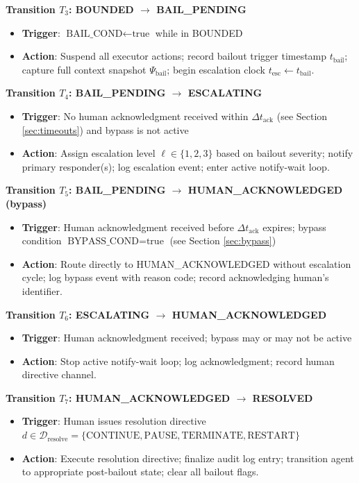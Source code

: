 \medskip\noindent\textbf{Transition $T_3$: BOUNDED $\rightarrow$ BAIL\_PENDING}
\begin{itemize}
  \item \textbf{Trigger}: $\text{BAIL\_COND} \gets \text{true}$ while in BOUNDED
  \item \textbf{Action}: Suspend all executor actions; record bailout trigger timestamp $t_{\text{bail}}$; capture full context snapshot $\Psi_{\text{bail}}$; begin escalation clock $t_{\text{esc}} \gets t_{\text{bail}}$.
\end{itemize}

\medskip\noindent\textbf{Transition $T_4$: BAIL\_PENDING $\rightarrow$ ESCALATING}
\begin{itemize}
  \item \textbf{Trigger}: No human acknowledgment received within $\Delta t_{\text{ack}}$ (see Section \ref{sec:timeouts}) and bypass is not active
  \item \textbf{Action}: Assign escalation level $\ell \in \{1, 2, 3\}$ based on bailout severity; notify primary responder(s); log escalation event; enter active notify-wait loop.
\end{itemize}

\medskip\noindent\textbf{Transition $T_5$: BAIL\_PENDING $\rightarrow$ HUMAN\_ACKNOWLEDGED (bypass)}
\begin{itemize}
  \item \textbf{Trigger}: Human acknowledgment received before $\Delta t_{\text{ack}}$ expires; bypass condition $\text{BYPASS\_COND} = \text{true}$ (see Section \ref{sec:bypass})
  \item \textbf{Action}: Route directly to HUMAN\_ACKNOWLEDGED without escalation cycle; log bypass event with reason code; record acknowledging human's identifier.
\end{itemize}

\medskip\noindent\textbf{Transition $T_6$: ESCALATING $\rightarrow$ HUMAN\_ACKNOWLEDGED}
\begin{itemize}
  \item \textbf{Trigger}: Human acknowledgment received; bypass may or may not be active
  \item \textbf{Action}: Stop active notify-wait loop; log acknowledgment; record human directive channel.
\end{itemize}

\medskip\noindent\textbf{Transition $T_7$: HUMAN\_ACKNOWLEDGED $\rightarrow$ RESOLVED}
\begin{itemize}
  \item \textbf{Trigger}: Human issues resolution directive $d \in \mathcal{D}_{\text{resolve}} = \{\text{CONTINUE}, \text{PAUSE}, \text{TERMINATE}, \text{RESTART}\}$
  \item \textbf{Action}: Execute resolution directive; finalize audit log entry; transition agent to appropriate post-bailout state; clear all bailout flags.
\end{itemize}

